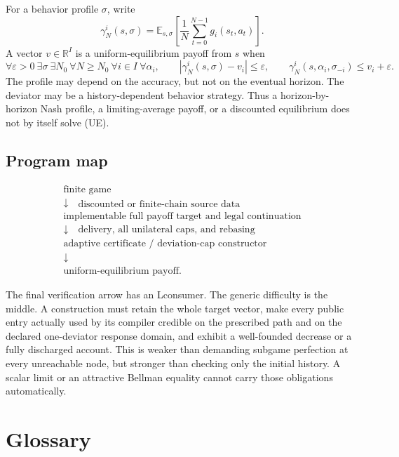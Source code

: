 \documentclass[11pt]{article}
\newcommand{\EE}{\mathbb E}
\newcommand{\RR}{\mathbb R}
\newcommand{\LTag}{\textsf{L}}
\begin{document}
For a behavior profile \(\sigma\), write
\[
 \gamma_N^i(s,\sigma)
 =\EE_{s,\sigma}\left[\frac1N\sum_{t=0}^{N-1}g_i(s_t,a_t)\right].
\]
A vector \(v\in\RR^I\) is a uniform-equilibrium payoff from \(s\) when
\[
 \forall\varepsilon>0\ \exists\sigma\ \exists N_0\
 \forall N\geq N_0\ \forall i\in I\ \forall\alpha_i,\qquad
 |\gamma_N^i(s,\sigma)-v_i|\leq\varepsilon,\qquad
 \gamma_N^i(s,\alpha_i,\sigma_{-i})\leq v_i+\varepsilon .
\tag{UE}
\]
The profile may depend on the accuracy, but not on the eventual horizon.
The deviator may be a history-dependent behavior strategy.  Thus a
horizon-by-horizon Nash profile, a limiting-average payoff, or a discounted
equilibrium does not by itself solve (UE).

\subsection{Program map}

\[
\boxed{\begin{array}{c}
\text{finite game}\\
\downarrow\quad\text{discounted or finite-chain source data}\\
\text{implementable full payoff target and legal continuation}\\
\downarrow\quad\text{delivery, all unilateral caps, and rebasing}\\
\text{adaptive certificate / deviation-cap constructor}\\
\downarrow\\
\text{uniform-equilibrium payoff.}
\end{array}}
\tag{1}
\]

The final verification arrow has an \LTag consumer.  The generic difficulty is
the middle.  A construction must retain the whole target vector, make every
public entry actually used by its compiler credible on the prescribed path and
on the declared one-deviator response domain, and exhibit a well-founded
decrease or a fully discharged account.  This is weaker than demanding
subgame perfection at every unreachable node, but stronger than checking only
the initial history.  A scalar limit or an attractive Bellman equality cannot
carry those obligations automatically.

\section{Glossary}
\end{document}
